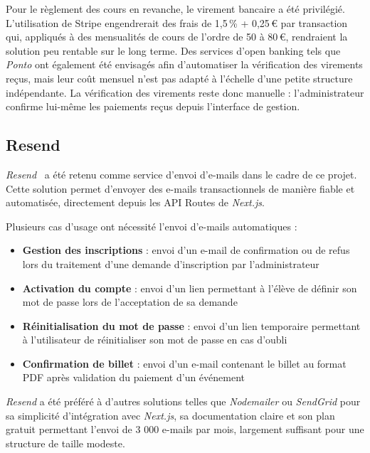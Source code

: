 \documentclass{article}
\begin{document}
Pour le règlement des cours en revanche, le virement bancaire a été
privilégié. L'utilisation de Stripe engendrerait des frais de 1,5\,\% + 0,25\,€ par transaction qui, appliqués à des mensualités de cours de l'ordre de 50 à 80\,€, rendraient la solution peu rentable sur le long terme. Des services 
d'open banking tels que \textit{Ponto} ont également été envisagés 
afin d'automatiser la vérification des virements reçus, mais leur 
coût mensuel n'est pas adapté à l'échelle d'une petite structure 
indépendante. La vérification des virements reste donc manuelle : 
l'administrateur confirme lui-même les paiements reçus depuis 
l'interface de gestion.

\subsection{Resend}

\textit{Resend}~\cite{resend} a été retenu comme service d'envoi d'e-mails dans le 
cadre de ce projet. Cette solution permet d'envoyer des e-mails 
transactionnels de manière fiable et automatisée, directement depuis 
les API Routes de \textit{Next.js}.

Plusieurs cas d'usage ont nécessité l'envoi d'e-mails automatiques :

\begin{itemize}
    \item \textbf{Gestion des inscriptions} : envoi d'un e-mail de 
    confirmation ou de refus lors du traitement d'une demande 
    d'inscription par l'administrateur
    \item \textbf{Activation du compte} : envoi d'un lien permettant 
    à l'élève de définir son mot de passe lors de l'acceptation 
    de sa demande
    \item \textbf{Réinitialisation du mot de passe} : envoi d'un 
    lien temporaire permettant à l'utilisateur de réinitialiser 
    son mot de passe en cas d'oubli
    \item \textbf{Confirmation de billet} : envoi d'un e-mail 
    contenant le billet au format PDF après validation du paiement 
    d'un événement
\end{itemize}

\textit{Resend} a été préféré à d'autres solutions telles que 
\textit{Nodemailer} ou \textit{SendGrid} pour sa simplicité 
d'intégration avec \textit{Next.js}, sa documentation claire 
et son plan gratuit permettant l'envoi de 3 000 e-mails par mois, 
largement suffisant pour une structure de taille modeste.
\end{document}
